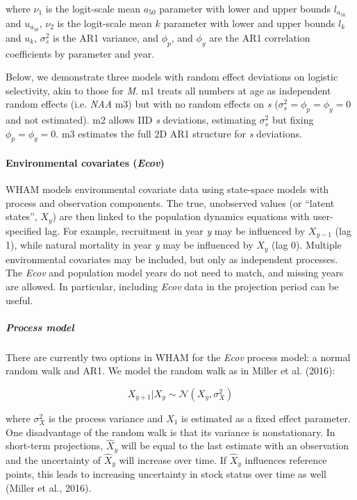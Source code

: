 \documentclass[]{article}
\let\oldparagraph\paragraph
\renewcommand{\paragraph}[1]{\oldparagraph{#1}\mbox{}}
\let\oldsubparagraph\subparagraph
\renewcommand{\subparagraph}[1]{\oldsubparagraph{#1}\mbox{}}
\begin{document}
where \(\nu_1\) is the logit-scale mean \(a_{50}\) parameter with lower
and upper bounds \(l_{a_{50}}\) and \(u_{a_{50}}\), \(\nu_2\) is the
logit-scale mean \(k\) parameter with lower and upper bounds \(l_k\) and
\(u_k\), \(\sigma^2_s\) is the AR1 variance, and \(\phi_p\), and
\(\phi_y\) are the AR1 correlation coefficients by parameter and year.

Below, we demonstrate three models with random effect deviations on
logistic selectivity, akin to those for \emph{M}. m1 treats all numbers
at age as independent random effects (i.e. \emph{NAA} m3) but with no
random effects on \emph{s} (\(\sigma^2_s = \phi_p = \phi_y = 0\) and not
estimated). m2 allows IID \emph{s} deviations, estimating \(\sigma^2_s\)
but fixing \(\phi_p = \phi_y = 0\). m3 estimates the full 2D AR1
structure for \emph{s} deviations.

\hypertarget{environmental-covariates-ecov}{%
\paragraph{\texorpdfstring{Environmental covariates
(\emph{Ecov})}{Environmental covariates (Ecov)}}\label{environmental-covariates-ecov}}

WHAM models environmental covariate data using state-space models with
process and observation components. The true, unobserved values (or
``latent states'', \(X_y\)) are then linked to the population dynamics
equations with user-specified lag. For example, recruitment in year
\emph{y} may be influenced by \(X_{y-1}\) (lag 1), while natural
mortality in year \emph{y} may be influenced by \(X_y\) (lag 0).
Multiple environmental covariates may be included, but only as
independent processes. The \emph{Ecov} and population model years do not
need to match, and missing years are allowed. In particular, including
\emph{Ecov} data in the projection period can be useful.

\hypertarget{process-model}{%
\subparagraph{Process model}\label{process-model}}

There are currently two options in WHAM for the \emph{Ecov} process
model: a normal random walk and AR1. We model the random walk as in
Miller et al. (2016):

\[X_{y+1} | X_y \sim \mathcal{N}\left( X_y, \sigma^2_X\right)\]

where \(\sigma^2_X\) is the process variance and \(X_1\) is estimated as
a fixed effect parameter. One disadvantage of the random walk is that
its variance is nonstationary. In short-term projections, \(\hat{X}_y\)
will be equal to the last estimate with an observation and the
uncertainty of \(\hat{X}_y\) will increase over time. If \(\hat{X}_y\)
influences reference points, this leads to increasing uncertainty in
stock status over time as well (Miller et al., 2016).
\end{document}
